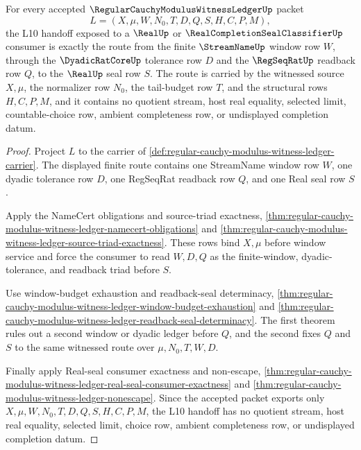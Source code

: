 \begin{theorem}
\label{thm:regular-cauchy-modulus-witness-ledger-streamname-regseqrat-real-exactness}
For every accepted $\RegularCauchyModulusWitnessLedgerUp$ packet
$$
L=(X,\mu,W,N_0,T,D,Q,S,H,C,P,M),
$$
the L10 handoff exposed to a $\RealUp$ or $\RealCompletionSealClassifierUp$ consumer is exactly the route from the finite $\StreamNameUp$ window row $W$, through the $\DyadicRatCoreUp$ tolerance row $D$ and the $\RegSeqRatUp$ readback row $Q$, to the $\RealUp$ seal row $S$. The route is carried by the witnessed source $X,\mu$, the normalizer row $N_0$, the tail-budget row $T$, and the structural rows $H,C,P,M$, and it contains no quotient stream, host real equality, selected limit, countable-choice row, ambient completeness row, or undisplayed completion datum.
\end{theorem}
\begin{proof}
Project $L$ to the carrier of \autoref{def:regular-cauchy-modulus-witness-ledger-carrier}. The displayed finite route contains one StreamName window row $W$, one dyadic tolerance row $D$, one RegSeqRat readback row $Q$, and one Real seal row $S$.

Apply the NameCert obligations and source-triad exactness, \autoref{thm:regular-cauchy-modulus-witness-ledger-namecert-obligations} and \autoref{thm:regular-cauchy-modulus-witness-ledger-source-triad-exactness}. These rows bind $X,\mu$ before window service and force the consumer to read $W,D,Q$ as the finite-window, dyadic-tolerance, and readback triad before $S$.

Use window-budget exhaustion and readback-seal determinacy, \autoref{thm:regular-cauchy-modulus-witness-ledger-window-budget-exhaustion} and \autoref{thm:regular-cauchy-modulus-witness-ledger-readback-seal-determinacy}. The first theorem rules out a second window or dyadic ledger before $Q$, and the second fixes $Q$ and $S$ to the same witnessed route over $\mu,N_0,T,W,D$.

Finally apply Real-seal consumer exactness and non-escape, \autoref{thm:regular-cauchy-modulus-witness-ledger-real-seal-consumer-exactness} and \autoref{thm:regular-cauchy-modulus-witness-ledger-nonescape}. Since the accepted packet exports only $X,\mu,W,N_0,T,D,Q,S,H,C,P,M$, the L10 handoff has no quotient stream, host real equality, selected limit, choice row, ambient completeness row, or undisplayed completion datum.
\end{proof}

